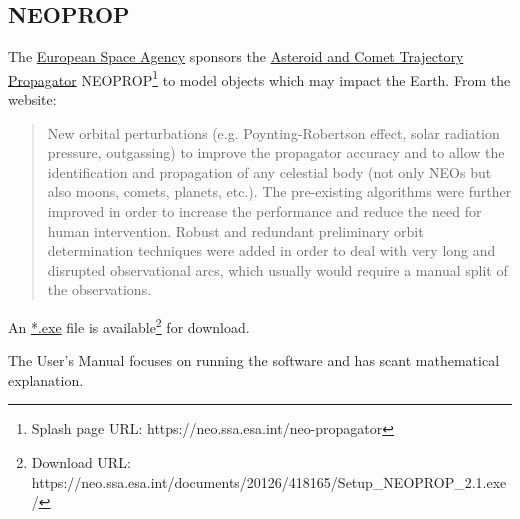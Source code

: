 \documentclass[a4paper,10pt]{article}
\begin{document}
\subsection{NEOPROP}
The \href{https://neo.ssa.esa.int/}{European Space Agency} sponsors the \href{https://neo.ssa.esa.int/neo-propagator}{Asteroid and Comet Trajectory Propagator} NEOPROP\footnote{Splash page URL: https://neo.ssa.esa.int/neo-propagator} to model objects which may impact the Earth.
From the website:
\begin{quotation}
New orbital perturbations (e.g. Poynting-Robertson effect, solar radiation pressure, outgassing) to improve the propagator accuracy and to allow the identification and propagation of any celestial body (not only NEOs but also moons, comets, planets, etc.).
The pre-existing algorithms were further improved in order to increase the performance and reduce the need for human intervention. Robust and redundant preliminary orbit determination techniques were added in order to deal with very long and disrupted observational arcs, which usually would require a manual split of the observations. 
\end{quotation}

An \href{https://neo.ssa.esa.int/documents/20126/418165/Setup\_NEOPROP\_2.1.exe/}{*.exe} file is available\footnote{Download URL: https://neo.ssa.esa.int/documents/20126/418165/Setup\_NEOPROP\_2.1.exe/} for download.

The User's Manual focuses on running the software and has scant mathematical explanation.

\end{document}
